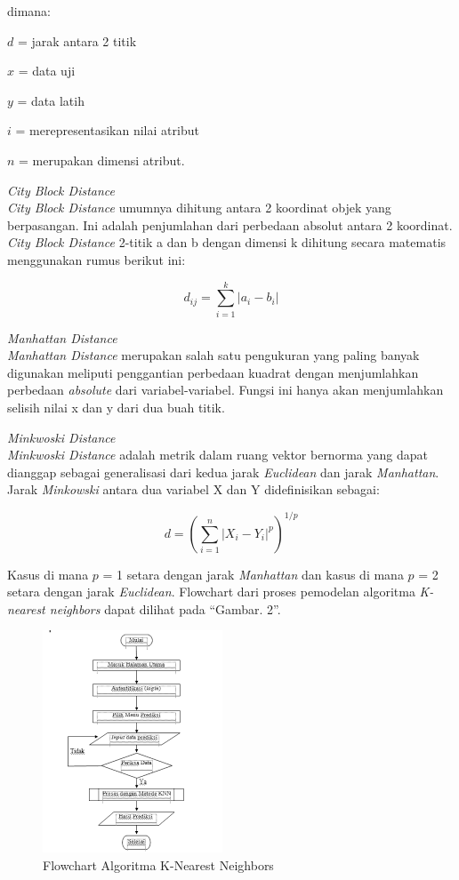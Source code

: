 \documentclass[conference]{IEEEtran}
\begin{document}
dimana:

$d$ = jarak antara 2 titik

$x$ = data uji

$y$ = data latih

$i$ = merepresentasikan nilai atribut

$n$ = merupakan dimensi atribut.\vspace{10pt}

\noindent\emph{City Block Distance}\\
\emph{City Block Distance} umumnya dihitung antara 2 koordinat objek yang berpasangan. Ini adalah penjumlahan dari perbedaan absolut antara 2 koordinat. \emph{City Block Distance} 2-titik a dan b dengan dimensi k dihitung secara matematis menggunakan rumus berikut ini:

\begin{equation*}
d_{ij}=\sum^{k}_{i=1} | a_i-b_i |
\label{eq2}
\end{equation*}

\noindent\emph{Manhattan Distance}\\
\emph{Manhattan Distance} merupakan salah satu pengukuran yang paling banyak digunakan meliputi penggantian perbedaan kuadrat dengan menjumlahkan perbedaan \emph{absolute} dari variabel-variabel. Fungsi ini hanya akan menjumlahkan selisih nilai x dan y dari dua buah titik.
\vspace{10pt}

\noindent\emph{Minkwoski Distance}\\
\emph{Minkwoski Distance} adalah metrik dalam ruang vektor bernorma yang dapat dianggap sebagai generalisasi dari kedua jarak \emph{Euclidean} dan jarak \emph{Manhattan}. Jarak \emph{Minkowski} antara dua variabel X dan Y didefinisikan sebagai:

\begin{equation*}
d = (\sum^{n}_{i=1} | X_i-Y_i |^p)^{1/p}
\label{eq3}
\end{equation*}

Kasus di mana $p$ = 1 setara dengan jarak \emph{Manhattan} dan kasus di mana $p$ = 2 setara dengan jarak \emph{Euclidean}.
Flowchart dari proses pemodelan algoritma \emph{K-nearest neighbors} dapat dilihat pada ``Gambar. 2''.\vspace{6pt}
\begin{figure}
\centering
\includegraphics[width=.4\textwidth]{Gambar/gambar3.png}
\caption{Flowchart Algoritma K-Nearest Neighbors}
\end{figure}
\end{document}
